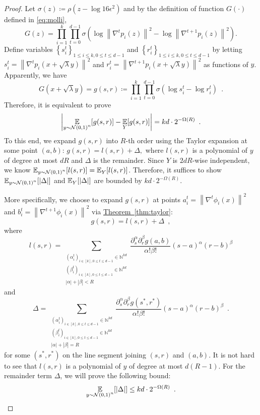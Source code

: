 \documentclass[12pt]{article}
\newcommand{\thm}[1]{\hyperref[thm:#1]{Theorem~\ref*{thm:#1}}}
\newcommand{\grad}[2]{\nabla^{#1}{#2}}
\newcommand{\br}[1]{\left(#1\right)} \newcommand{\Br}[1]{\left[#1\right]} \newcommand{\st}[1]{\left\{#1\right\}} \newcommand{\tr}[1]{\mathrm{Tr}\!\Br{#1}} \newcommand{\abs}[1]{\left|#1 \right|} \newcommand{\norm}[1]{\left\lVert #1 \right\rVert} \newcommand{\agl}[2]{\theta^{\br{#1}}_{#2}} \newcommand{\aglp}[2]{{\theta'}^{\br{#1}}_{#2}} \newcommand{\lint}[1]{\left\lfloor#1\right\rfloor} \newcommand{\poly}[1]{\mathrm{poly}\!\br{#1}} \newcommand{\negl}[1]{\mathrm{negl}\!\br{#1}} \newcommand{\de}[1]{\mathrm{d}#1} \newcommand{\val}[1]{\mathrm{val}\!\br{#1}} \newcommand{\vall}[1]{\mathrm{val}\br{#1}} \newcommand{\nd}[1]{\mathcal{N}\!\br{#1}} \newcommand{\ketbratwo}[2]{\ket{#1} \hspace{-0.4em}\bra{#2}} \newcommand{\ketbra}[1]{\ketbratwo{#1}{#1}} \newcommand{\id}{\ensuremath{\mathds{1}}} \newcommand{\ogroup}[1]{\mathrm{O}\!\br{#1}} \newcommand{\ugroup}[1]{\mathrm{U}\!\br{#1}} \newcommand{\td}{\mathrm{TD}} \newcommand{\tv}[1]{\norm{#1}_{\mathrm{TV}}} \newcommand {\defeq} {\ensuremath{ \stackrel{\mathrm{def}}{=} }} \newcommand{\vdim}{\ensuremath{N}} \newcommand{\dimin}{\ensuremath{n}} \newcommand{\dimout}{\ensuremath{m}} \newcommand{\ncopy}{\ell} \newcommand{\hspacein}{\H_\mathrm{in}} \newcommand{\hspaceout}{\H_\mathrm{out}} \newcommand{\Sin}{\S(\hspacein)} \newcommand{\Sout}{\S(\hspaceout)} \newcommand{\haar}{\ensuremath{\mu}} \newcommand{\tensorhaar}{\ensuremath{\eta}} \newcommand{\tensorsrss}{\ensuremath{\nu}} \newcommand{\qadvice}{\ensuremath{\rho}} \newcommand{\tp}{\otimes} \newcommand{\wone}[2]{W_1\!\br{#1,#2}}
\begin{document}
\begin{proof}
	Let $\sigma(z) \coloneq \rho(z - \log{16\epsilon^2})$ and by the definition of function $G\br{\cdot}$ defined in \eqref{eq:molli},
	\[G(z) = \prod_{i=1}^{k} \prod_{t=0}^{d-1} \sigma\!\br{ \log \norm{\grad{t}{p_i(z)}}^2 - \log \norm{\grad{t+1}{p_i(z)}}^2 }.\]
	Define variables $\st{s_i^t}_{1\leq i\leq k, 0\leq t\leq d-1}$ and $\st{r_i^t}_{1\leq i\leq k, 0\leq t\leq d-1}$ by letting $s_i^t = \norm{\grad{t}{p_i(x+\sqrt{\lambda}y)}}^2$ and $r_i^t = \norm{\grad{t+1}{p_i(x+\sqrt{\lambda}y)}}^2$ as functions of $y$.
	Apparently, we have
	\[
		G(x+\sqrt{\lambda}y) = g(s,r) \coloneq 
		\prod_{i=1}^{k} \prod_{t=0}^{d-1} \sigma\!\br{ \log s_i^t - \log r_i^t } \enspace .
	\]
	Therefore, it is equivalent to prove
	\[
		\abs{
		\expect{y\sim\NN\br{0,1}^n}{
			g(s,r)
		}
		-
		\expect{Y}{
			g(s,r)
		}
	} = kd\cdot 2^{-\Omega(R)} \enspace .
	\]
	To this end, we expand $g(s,r)$ into $R$-th order using the Taylor expansion at some point $(a,b)$:
	$
		g(s,r) = l(s,r) + \Delta,
	$
	where $l(s,r)$ is a polynomial of $y$ of degree at most $dR$ and $\Delta$ is the remainder.
	Since $Y$ is $2dR$-wise independent, we know
	$
		\expect{y\sim\NN\br{0,1}^n}{
			l(s,r)
		}
		=
		\expect{Y}{
			l(s,r)
		}
	$.
	Therefore, it suffices to show $\expect{y\sim\NN\br{0,1}^n}{\abs{\Delta}}$ and $\expect{Y}{\abs{\Delta}}$ are bounded by $kd\cdot 2^{-\Omega(R)}$.
	
	More specifically, we choose to expand $g(s,r)$ at points $a_i^t = \norm{\grad{t}{\phi_i(x)}}^2$ and $b_i^t = \norm{\grad{t+1}{\phi_i(x)}}^2$ via \thm{taylor}:
	\[
		g(s,r) = l(s,r) + \Delta \enspace,
	\]
	where
	\[
		l(s,r) = \sum_{\substack{ \br{\alpha^{t}_i}_{i\in[k], 0\leq t\leq d-1} \in\mathbb{N}^{kd}\\
		\br{\beta^{t}_i}_{i\in[k], 0\leq t\leq d-1}\in\mathbb{N}^{kd}
		\\ \abs{\alpha} +\abs{\beta} <R }}	
		\frac{\partial^\alpha_s\partial^\beta_r g(a,b)}{\alpha!\beta!}(s-a)^\alpha(r-b)^\beta
	\]
	and
	\[
		\Delta = \sum_{\substack{ \br{\alpha^{t}_i}_{i\in[k], 0\leq t\leq d-1} \in\mathbb{N}^{kd}\\
		\br{\beta^{t}_i}_{i\in[k], 0\leq t\leq d-1}\in\mathbb{N}^{kd}
		\\ \abs{\alpha} +\abs{\beta} =R }}	
		\frac{ \partial^\alpha_s\partial^\beta_r g(s^*,r^*) }{\alpha!\beta!}(s-a)^\alpha(r-b)^\beta \enspace .
	\]
	for some $(s^*,r^*)$ on the line segment joining $(s,r)$ and $(a,b)$.
	It is not hard to see that
	$l(s,r)$ is a polynomial of $y$ of degree at most $d(R-1)$.
	For the remainder term $\Delta$, we will prove the following bound:
\[
	\expect{y\sim\NN\br{0,1}^n}{\abs{\Delta}} \leq kd\cdot 2^{-\Omega(R)} \enspace.
\]



\end{proof}
\end{document}
